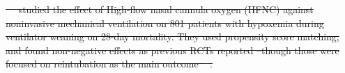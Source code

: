 \documentclass[10pt,letterpaper]{article}
\providecommand{\DIFdeltex}[1]{{\protect\color{red}\sout{#1}}}                      %
\providecommand{\DIFdelbegin}{} %
\providecommand{\DIFdelend}{} %
\providecommand{\DIFdel}[1]{\texorpdfstring{\DIFdeltex{#1}}{}} %
\newcommand{\DIFscaledelfig}{0.5}
\newlength{\DIFdelgraphicswidth} %
\newlength{\DIFdelgraphicsheight} %
\newcommand{\DIFdelincludegraphics}[2][]{%
\sbox{\DIFdelgraphicsbox}{\DIFOincludegraphics[#1]{#2}}%
\settoboxwidth{\DIFdelgraphicswidth}{\DIFdelgraphicsbox} %
\settoboxtotalheight{\DIFdelgraphicsheight}{\DIFdelgraphicsbox} %
\scalebox{\DIFscaledelfig}{%
\parbox[b]{\DIFdelgraphicswidth}{\usebox{\DIFdelgraphicsbox}\\[-\baselineskip] \rule{\DIFdelgraphicswidth}{0em}}\llap{\resizebox{\DIFdelgraphicswidth}{\DIFdelgraphicsheight}{%
\setlength{\unitlength}{\DIFdelgraphicswidth}%
\begin{picture}(1,1)%
\thicklines\linethickness{2pt} %
{\color[rgb]{1,0,0}\put(0,0){\framebox(1,1){}}}%
{\color[rgb]{1,0,0}\put(0,0){\line( 1,1){1}}}%
{\color[rgb]{1,0,0}\put(0,1){\line(1,-1){1}}}%
\end{picture}%
}\hspace*{3pt}}} %
} %
\DeclareRobustCommand{\DIFdelbegin}{\DIFOdelbegin \let\includegraphics\DIFdelincludegraphics} %
\DeclareRobustCommand{\DIFdelend}{\DIFOaddend \let\includegraphics\DIFOincludegraphics} %
\begin{document}
\DIFdelbegin %
\DIFdel{\mbox{%
    \cite{liu2021effects} }\hskip0pt%
  studied the effect of \textcolor{I}{High-flow
    nasal cannula oxygen (HFNC)} against \textcolor{C}{noninvasive
    mechanical ventilation} on \textcolor{P}{801 patients with hypoxemia
    during ventilator weaning} on \textcolor{O}{28-day mortality}. They
  used propensity score matching, and found non-negative effects as
  previous RCTs reported --though those were focused on reintubation as the
  main outcome \mbox{%
    \cite{stephan2015high,hernandez2016effect}}\hskip0pt%
  .
}\DIFdelend %
\end{document}

